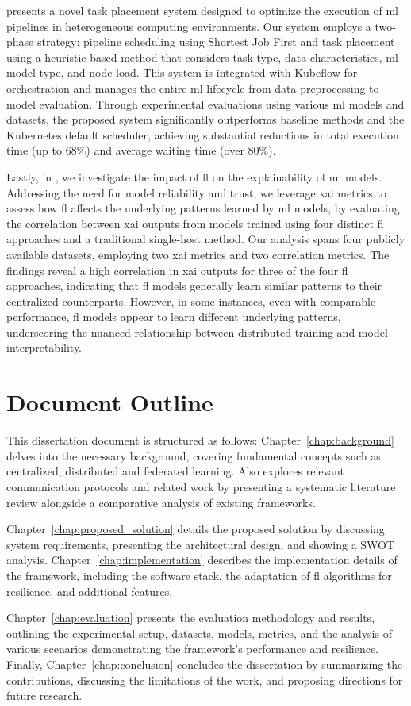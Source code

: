 \cite{mlops-placement-icct} presents a novel task placement system designed to optimize the execution of \ac{ml} pipelines in heterogeneous computing environments. Our system employs a two-phase strategy: pipeline scheduling using Shortest Job First and task placement using a heuristic-based method that considers task type, data characteristics, \ac{ml} model type, and node load. This system is integrated with Kubeflow for orchestration and manages the entire \ac{ml} lifecycle from data preprocessing to model evaluation. Through experimental evaluations using various \ac{ml} models and datasets, the proposed system significantly outperforms baseline methods and the Kubernetes default scheduler, achieving substantial reductions in total execution time (up to 68\%) and average waiting time (over 80\%). 

Lastly, in \cite{Teixeira102025}, we investigate the impact of \ac{fl} on the explainability of \ac{ml} models. Addressing the need for model reliability and trust, we leverage \ac{xai} metrics to assess how \ac{fl} affects the underlying patterns learned by \ac{ml} models, by evaluating the correlation between \ac{xai} outputs from models trained using four distinct \ac{fl} approaches and a traditional single-host method. Our analysis spans four publicly available datasets, employing two \ac{xai} metrics and two correlation metrics. The findings reveal a high correlation in \ac{xai} outputs for three of the four \ac{fl} approaches, indicating that \ac{fl} models generally learn similar patterns to their centralized counterparts. However, in some instances, even with comparable performance, \ac{fl} models appear to learn different underlying patterns, underscoring the nuanced relationship between distributed training and model interpretability.


\section{Document Outline}
\label{sec:outline}

This dissertation document is structured as follows: Chapter~\ref{chap:background} delves into the necessary background, covering fundamental concepts such as centralized, distributed and federated learning. Also explores relevant communication protocols and related work by presenting a systematic literature review alongside a comparative analysis of existing frameworks. 

Chapter~\ref{chap:proposed_solution} details the proposed solution by discussing system requirements, presenting the architectural design, and showing a SWOT analysis. Chapter~\ref{chap:implementation} describes the implementation details of the framework, including the software stack, the adaptation of \ac{fl} algorithms for resilience, and additional features. 

Chapter~\ref{chap:evaluation} presents the evaluation methodology and results, outlining the experimental setup, datasets, models, metrics, and the analysis of various scenarios demonstrating the framework's performance and resilience. Finally, Chapter~\ref{chap:conclusion} concludes the dissertation by summarizing the contributions, discussing the limitations of the work, and proposing directions for future research.
